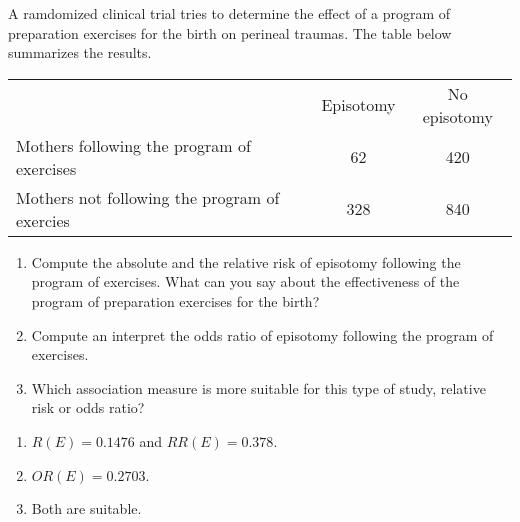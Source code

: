 {A ramdomized clinical trial tries to determine the effect of a program of preparation exercises for the birth on perineal traumas. 
The table below summarizes the results. 
\begin{center}
	\begin{tabular}{lcc}
		\toprule
		 & Episotomy & No episotomy\\
		 Mothers following the program of exercises & 62 & 420 \\
		 Mothers not following the program of exercies & 328 & 840\\
		\bottomrule
	\end{tabular}
\end{center}

\begin{enumerate}
\item Compute the absolute and the relative risk of episotomy following the program of exercises.
What can you say about the effectiveness of the program of preparation exercises for the birth?
\item Compute an interpret the odds ratio of episotomy following the program of exercises.
\item Which association measure is more suitable for this type of study, relative risk or odds ratio?
\end{enumerate}
}
{
\begin{enumerate}
\item $R(E)=0.1476$ and $RR(E)=0.378$.
\item $OR(E)=0.2703$.
\item Both are suitable.
\end{enumerate}
}
{}